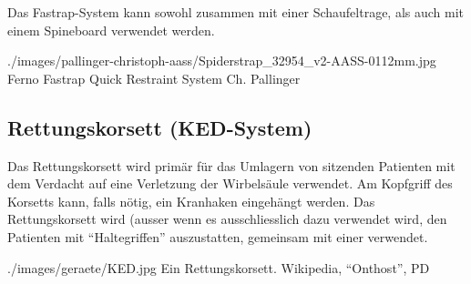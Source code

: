 {%
Das Fastrap{\texttrademark}-System kann sowohl zusammen mit
einer Schaufeltrage, als auch mit einem Spineboard verwendet
werden. 
% 
}{

}
{}
{}
{}

{}
{}
{./images/pallinger-christoph-aass/Spiderstrap_32954_v2-AASS-0112mm.jpg}
{Ferno Fastrap{\texttrademark} Quick Restraint System}
{Ch. Pallinger}










% 
\subsection{Rettungskorsett (KED{\texttrademark}-System)}
\label{topic:rettungskorsett-anwendung}
\label{topic:rettungskorsett-beschreibung}




{%
Das Rettungskorsett wird primär für das Umlagern von
sitzenden Patienten mit dem Verdacht auf eine Verletzung der
Wirbelsäule verwendet. Am Kopfgriff des
Korsetts kann, falls nötig, ein Kranhaken eingehängt
werden. Das Rettungskorsett wird (ausser wenn es
ausschliesslich dazu verwendet wird, den Patienten mit
\enquote{Haltegriffen} auszustatten, gemeinsam mit einer
 verwendet.
}{

}
{}
{}
{}

{}
{}
{./images/geraete/KED.jpg}
{Ein Rettungskorsett.}
{Wikipedia, \enquote{Onthost}, PD}

